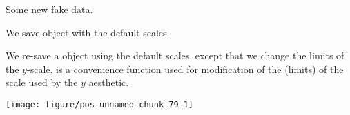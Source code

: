 \documentclass[paper=a4,10pt,div=17,headsepline,BCOR=12mm,twoside,open=right]{scrbook}\usepackage{knitr}
\begin{document}
Some new fake data.

\begin{knitrout}\footnotesize
{}\color{fgcolor}\begin{kframe}
\begin{alltt}
 \hlkwb{<-}
  \hlstd{(} \hlstd{=} \hlstd{(}\hlstd{(}\hlstd{,} \hlstd{=}\hlstd{,} \hlstd{=}\hlstd{),}
                   \hlstd{(}\hlstd{,} \hlstd{=}\hlstd{,} \hlstd{=}\hlstd{)),}
              \hlstd{=} \hlstd{(}\hlstd{(}\hlstd{(}\hlstd{,} \hlstd{),} \hlstd{(}\hlstd{,} \hlstd{))),}
              \hlstd{=} \hlstd{(}\hlstd{,} \hlstd{=}\hlstd{,} \hlstd{=}\hlstd{))}
\end{alltt}
\end{kframe}
\end{knitrout}

We save  object with the default scales.

\begin{knitrout}\footnotesize
{}\color{fgcolor}\begin{kframe}
\begin{alltt}
 \hlkwb{<-}   \hlopt{+} \hlstd{()}
\end{alltt}
\end{kframe}
\end{knitrout}

We re-save a  object using the default scales, except that we change the limits of the $y$-scale.  is a convenience function used for modification of the  (limits) of the scale used by the $y$ aesthetic.

\begin{knitrout}\footnotesize
{}\color{fgcolor}\begin{kframe}
\begin{alltt}
 \hlopt{+} \hlstd{(}\hlstd{,} \hlstd{)}
\end{alltt}
\end{kframe}

{\centering \texttt{[image: figure/pos-unnamed-chunk-79-1]} 

}



\end{knitrout}
\end{document}
